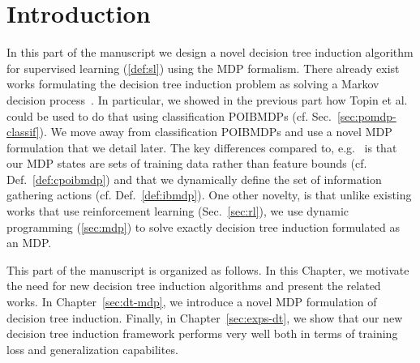 \chapter{Introduction}\label{sec:part2}
In this part of the manuscript we design a novel decision tree induction algorithm for supervised learning (\ref{def:sl}) using the MDP formalism.
There already exist works formulating the decision tree induction problem as solving a Markov decision process~\cite{Dulac_Arnold_2011,garlapati2015reinforcementlearningapproachonline,topin2021iterative,chaouki2024branchesfastdynamicprogramming}.
In particular, we showed in the previous part how Topin et al.~\cite{topin2021iterative} could be used to do that using classification POIBMDPs (cf. Sec.~\ref{sec:pomdp-classif}).
We move away from classification POIBMDPs and use a novel MDP formulation that we detail later.
The key differences compared to, e.g.~\cite{topin2021iterative} is that our MDP states are sets of training data rather than feature bounds (cf. Def.~\ref{def:cpoibmdp}) and that we dynamically define the set of information gathering actions (cf. Def.~\ref{def:ibmdp}).
One other novelty, is that unlike existing works that use reinforcement learning (Sec.~\ref{sec:rl}), we use dynamic programming (\ref{sec:mdp}) to solve exactly decision tree induction formulated as an MDP.

This part of the manuscript is organized as follows.
In this Chapter, we motivate the need for new decision tree induction algorithms and present the related works.
In Chapter~\ref{sec:dt-mdp}, we introduce a novel MDP formulation of decision tree induction.
Finally, in Chapter~\ref{sec:exps-dt}, we show that our new decision tree induction framework performs very well both in terms of training loss and generalization capabilites.

